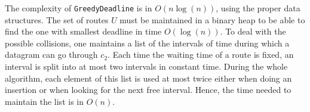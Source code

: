 \documentclass[a4paper,10pt]{article}
\newcommand\greedydeadline{\texttt{GreedyDeadline}\xspace}
\begin{document}
     
   
       
      

   


    The complexity of \greedydeadline is in $O(n\log(n))$, using the proper data structures. The set of routes $U$ must be maintained in a binary heap to be able to find the one with smallest deadline in time $O(\log(n))$. To deal with the possible collisions, one maintains a list of the intervals
    of time during which a datagram can go through $c_2$. Each time the waiting time of a route is fixed, an interval is split into at most two intervals in constant time. During the whole algorithm, each element of this list is used at most twice either when doing an insertion or when looking for the next free interval. Hence, the time needed to maintain the list is in $O(n)$. 
  
\end{document}
